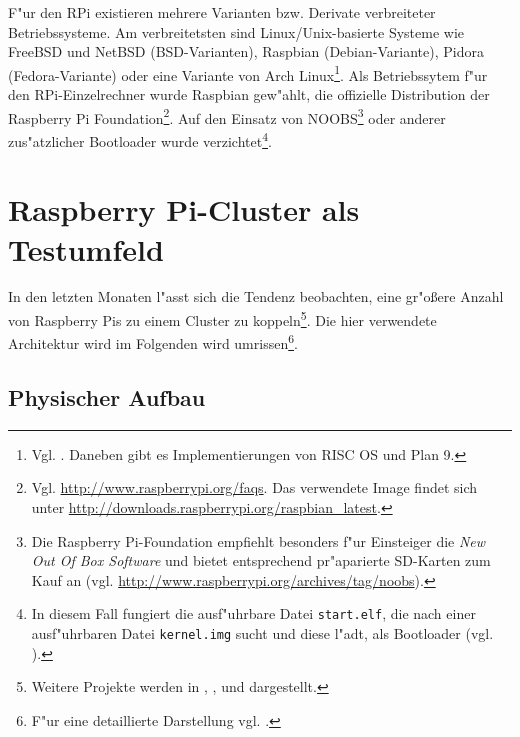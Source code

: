 F"ur den RPi existieren mehrere Varianten bzw. Derivate verbreiteter Betriebssysteme. Am verbreitetsten sind Linux/Unix-basierte Systeme wie FreeBSD und NetBSD (BSD-Varianten), Raspbian (Debian-Variante), Pidora (Fedora-Variante) oder eine Variante von Arch Linux\footnote{Vgl. \cite{pow12}. Daneben gibt es Implementierungen von RISC OS und Plan 9.}. Als Betriebssytem f"ur den RPi-Einzelrechner wurde Raspbian gew"ahlt, die offizielle Distribution der Raspberry Pi Foundation\footnote{Vgl. \url{http://www.raspberrypi.org/faqs}. Das verwendete Image findet sich unter \url{http://downloads.raspberrypi.org/raspbian_latest}.}. Auf den Einsatz von NOOBS\footnote{Die Raspberry Pi-Foundation empfiehlt besonders f"ur Einsteiger die \textit{New Out Of Box Software} und bietet entsprechend pr"aparierte SD-Karten zum Kauf an (vgl. \url{http://www.raspberrypi.org/archives/tag/noobs}).} oder anderer zus"atzlicher Bootloader wurde verzichtet\footnote{In diesem Fall fungiert die ausf"uhrbare Datei \texttt{start.elf}, die nach einer ausf"uhrbaren Datei \texttt{kernel.img} sucht und diese l"adt, als Bootloader (vgl. \cite{kli13}).}.

\section{Raspberry Pi-Cluster als Testumfeld}\label{Spezifikation Bramble}

In den letzten Monaten l"asst sich die Tendenz beobachten, eine gr"o\ss ere Anzahl von Raspberry Pis zu einem Cluster zu koppeln\footnote{Weitere Projekte werden in \cite{cox13}, \cite{kie01}, \cite{bal12} und \cite{ou13} dargestellt.}. Die hier verwendete Architektur wird im Folgenden wird umrissen\footnote{F"ur eine detaillierte Darstellung vgl. \cite{kli13}.}. 

\subsection{Physischer Aufbau}\label{Bramble Hardware}

